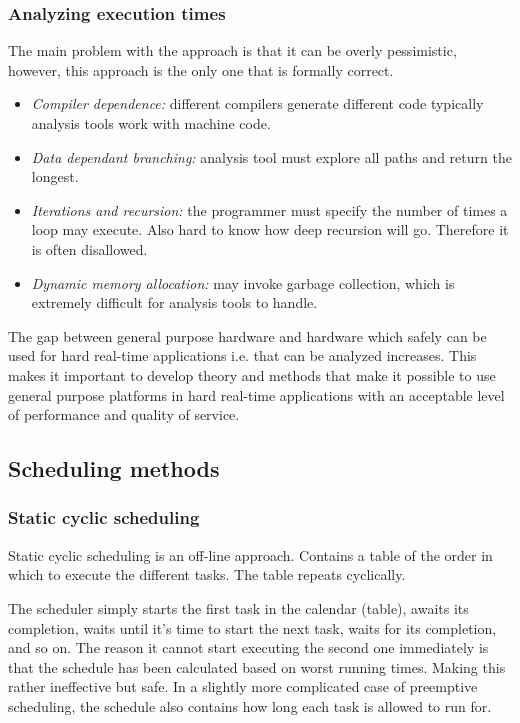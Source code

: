 \documentclass[a4paper]{article}
\begin{document}
\subsubsection{Analyzing execution times}
The main problem with the approach is that it can be overly pessimistic, however,
this approach  is the only one that is formally correct.

\begin{itemize}
  \item \emph{Compiler dependence:} different compilers generate different code
        typically analysis tools work with machine code.
  \item \emph{Data dependant branching:} analysis tool must explore all paths
        and return the longest.
  \item \emph{Iterations and recursion:} the programmer must specify the number
        of times a loop may execute. Also hard to know how deep recursion will
        go. Therefore it is often disallowed.
  \item \emph{Dynamic memory allocation:} may invoke garbage collection, which
        is extremely difficult for analysis tools to handle.
\end{itemize}

The gap between general purpose hardware and hardware which safely can be used
for hard real-time applications i.e. that can be analyzed increases. This makes
it important to develop theory and methods that make it possible to use general
purpose platforms in hard real-time applications with an acceptable level of
performance and quality of service.

\subsection{Scheduling methods}
\subsubsection{Static cyclic scheduling}
Static cyclic scheduling is an off-line approach. Contains a table of the order
in which to execute the different tasks. The table repeats cyclically.

The scheduler simply starts the first task in the calendar (table), awaits its
completion, waits until it's time to start the next task, waits for its
completion, and so on. The reason it cannot start executing the second one
immediately is that the schedule has been calculated based on worst running
times. Making this rather ineffective but safe. In a slightly more complicated
case of preemptive scheduling, the schedule also contains how long each task is
allowed to run for.
\end{document}
